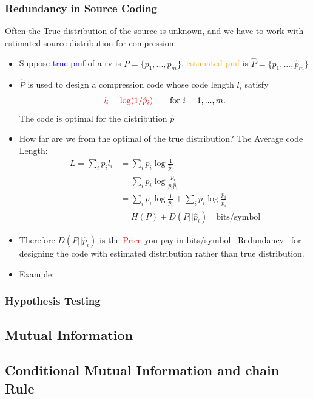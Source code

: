 \documentclass[24pt]{article}
\begin{document}
\subsubsection{Redundancy in Source Coding}
Often the \textcolor{blue1}{True distribution} of the source is unknown, and we have to work with estimated source distribution for compression.
\begin{itemize}
\item Suppose \textcolor{blue}{true pmf} of a rv is $P = \{ p_1,...,p_m\}$, \textcolor{orange}{estimated pmf} is $\hat{P} = \{ \hat{p}_1,...,\hat{p}_m\}$
\item $\hat{P}$ is used to design a compression code whose code length $\mathit{l}_i$ satisfy
\[
\textcolor{red}{ \mathit{l}_i = \log(1/\hat{p}_i) }\qquad \textrm{for } i=1,...,m.
\]
The code is optimal for the distribution $\hat{p}$
\item How far are we from the optimal of the \textcolor{blue1}{true distribution}?
The Average code Length:
\begin{align*}
L = \sum_ip_i\mathit{l}_i & = \sum_{i}p_i \log \frac{1}{\hat{p}_i} \\
& = \sum_{i}p_i \log\frac{p_i}{p_i\hat{p}_i} \\
& = \sum_{i}p_i \log\frac{1}{p_i} + \sum_{i}p_i \log\frac{p_i}{\hat{p}_i} \\
& = H(P) + D(P||\hat{p}_i) \quad \textrm{bits/symbol}
\end{align*}
\item Therefore  $D(P||\hat{p}_i)$ is the \textcolor{red}{Price} you pay in bits/symbol --Redundancy-- for designing the code with estimated distribution rather than true distribution.

\item Example:  

\end{itemize}

\subsubsection{Hypothesis Testing}

\subsection{Mutual Information}


\subsection{Conditional Mutual Information and chain Rule}
\end{document}
